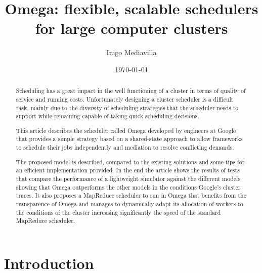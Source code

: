 \documentclass{article}                     %
\begin{document}
\title{  Omega: flexible, scalable schedulers for large computer clusters  }


\author{ Inigo Mediavilla }

\date{\today}

\maketitle

\begin{abstract}

Scheduling has a great impact in the well functioning of a cluster in
terms of quality of service and running costs.  Unfortunately
designing a cluster scheduler is a difficult task, mainly due to the
diversity of scheduling strategies that the scheduler needs to support
while remaining capable of taking quick scheduling decisions.

This article describes the scheduler called Omega developed by
engineers at Google that provides a simple strategy based on a
shared-state approach to allow frameworks to schedule their jobs
independently and mediation to resolve conflicting demands.

The proposed model is described, compared to the existing solutions
and some tips for an efficient implementation provided. In the end the
article shows the results of tests that compare the performance of a
lightweight simulator against the different models showing that Omega
outperforms the other models in the conditions Google's cluster
traces. It also proposes a MapReduce scheduler to run in Omega that
benefits from the transparence of Omega and manages to dynamically
adapt its allocation of workers to the conditions of the cluster
increasing significantly the speed of the standard MapReduce scheduler.


\end{abstract}

\section{Introduction}
\end{document}
